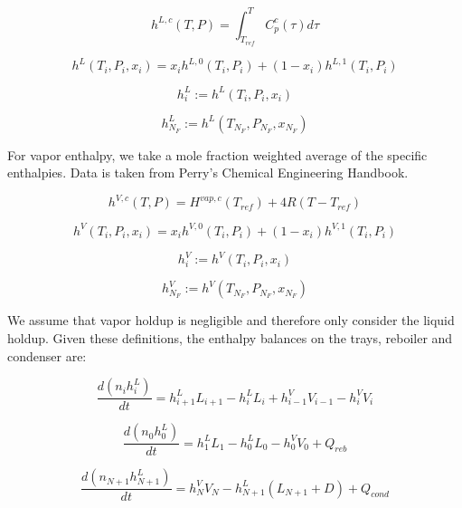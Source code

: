 \begin{equation}
    h^{L,c}(T,P) = \int_{T_{ref}}^T C_p^c(\tau)d\tau 
\end{equation}

\begin{equation}
    h^L(T_i, P_i, x_i) = x_ih^{L,0}(T_i,P_i) + (1-x_i)h^{L,1}(T_i,P_i)
\end{equation}

\begin{equation}
    h^L_i := h^L(T_i, P_i,x_i)
\end{equation}

\begin{equation}
    h^L_{N_F} := h^L(T_{N_F}, P_{N_F},x_{N_F})
\end{equation}


For vapor enthalpy, we take a mole fraction weighted average of the specific enthalpies. Data is taken from Perry’s Chemical Engineering Handbook.

\begin{equation}
    h^{V,c}(T,P) = H^{vap, c}(T_{ref}) + 4R(T-T_{ref})
\end{equation}

\begin{equation}
    h^V(T_i, P_i, x_i) = x_i h^{V,0}(T_i,P_i) + (1-x_i) h^{V,1}(T_i,P_i)
\end{equation}


\begin{equation}
    h^V_i := h^V(T_i, P_i,x_i)
\end{equation}

\begin{equation}
    h^V_{N_F} := h^V(T_{N_F}, P_{N_F},x_{N_F})
\end{equation}

    
We assume that vapor holdup is negligible and therefore only consider the liquid holdup. Given these definitions, the enthalpy balances on the trays, reboiler and condenser are:

\begin{equation}
    \frac{d(n_ih^L_i)}{dt} =  h^L_{i+1}L_{i+1}-h^L_iL_i+h^V_{i-1}V_{i-1}-h^V_iV_i
\end{equation}

\begin{equation}
    \frac{d(n_0h^L_0)}{dt} = h^L_1L_1 - h^L_0L_0 - h^V_0V_0 + Q_{reb}
\end{equation}


\begin{equation}
    \frac{d(n_{N+1}h^L_{N+1})}{dt} = h^V_NV_{N}-h^L_{N+1}(L_{N+1} + D) + Q_{cond}
\end{equation}

